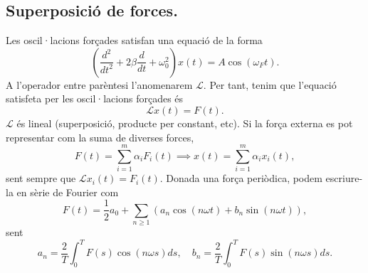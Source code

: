 \subsection{Superposició de forces.}
Les oscil·lacions forçades satisfan una equació de la forma
\[
\boxed{
	\left(\dfrac{d^2}{dt^2}+2\beta\dfrac{d}{dt}+\omega_0^2\right)x(t)=A\cos(\omega_Ft).
}
\]
A l'operador entre parèntesi l'anomenarem $\mathcal L$. Per tant, tenim que l'equació satisfeta per les oscil·lacions forçades és
\[
\mathcal L x(t)=F(t).
\]
$\mathcal L$ és lineal (superposició, producte per constant, etc). Si la força externa es pot representar com la suma de diverses forces,
\[
F(t)=\sum_{i=1}^m\alpha_iF_i(t)\implies x(t)=\sum_{i=1}^m\alpha_ix_i(t),
\]
sent sempre que $\mathcal L x_i(t)=F_i(t)$. Donada una força periòdica, podem escriure-la en sèrie de Fourier com
\[
F(t)=\dfrac{1}{2}a_0+\sum_{n\geq1}(a_n\cos(n\omega t)+b_n\sin(n\omega t)),
\]
sent
\[
a_n=\dfrac{2}{T}\int_0^TF(s)\cos(n\omega s)ds,\quad
b_n=\dfrac{2}{T}\int_0^TF(s)\sin(n\omega s)ds.
\]
